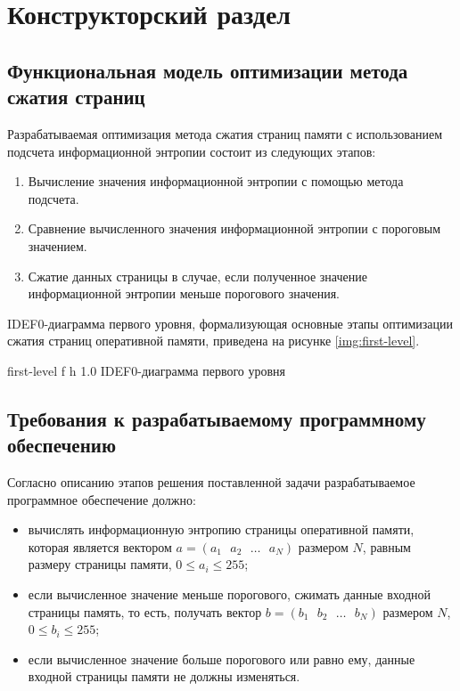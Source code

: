 \chapter{Конструкторский раздел}

\section{Функциональная модель оптимизации метода сжатия страниц}

Разрабатываемая оптимизация метода сжатия страниц памяти с использованием подсчета информационной энтропии состоит из следующих этапов:

\begin{enumerate}
	\item Вычисление значения информационной энтропии с помощью метода подсчета.
	\item Сравнение вычисленного значения информационной энтропии с пороговым значением.
	\item Сжатие данных страницы в случае, если полученное значение информационной энтропии меньше порогового значения.
\end{enumerate}

IDEF0-диаграмма первого уровня, формализующая основные этапы оптимизации сжатия страниц оперативной памяти, приведена на рисунке \ref{img:first-level}.
    
    {first-level}
    {f}
    {h}
    {1.0\textwidth}
    {IDEF0-диаграмма первого уровня}

\section{Требования к разрабатываемому программному обеспечению}

Согласно описанию этапов решения поставленной задачи разрабатываемое программное обеспечение должно:

\begin{itemize}
	\item вычислять информационную энтропию страницы оперативной памяти, которая является вектором $a = (a_1\text{ }a_2\text{ }\dotso\text{ }a_N)$ размером $N$, равным размеру страницы памяти, $0 \leq a_i \leq 255$;
	\item если вычисленное значение меньше порогового, сжимать данные входной страницы память, то есть, получать вектор $b = (b_1\text{ }b_2\text{ }\dotso\text{ }b_N)$ размером $N$, $0 \leq b_i \leq 255$;
	\item если вычисленное значение больше порогового или равно ему, данные входной страницы памяти не должны изменяться.
\end{itemize}

